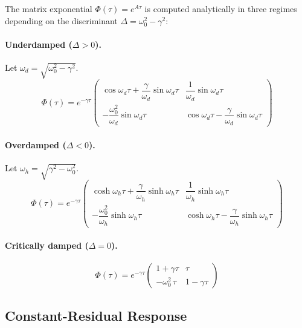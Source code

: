\documentclass[11pt,a4paper]{article}
\begin{document}
The matrix exponential $\Phi(\tau) = e^{A\tau}$ is computed analytically in
three regimes depending on the discriminant
$\Delta = \omega_0^2 - \gamma^2$:

\paragraph{Underdamped ($\Delta > 0$).}
Let $\omega_d = \sqrt{\omega_0^2 - \gamma^2}$.
\begin{equation}\label{eq:phi-under}
  \Phi(\tau) = e^{-\gamma\tau}
  \begin{pmatrix}
    \cos\omega_d\tau + \dfrac{\gamma}{\omega_d}\sin\omega_d\tau &
    \dfrac{1}{\omega_d}\sin\omega_d\tau \\[8pt]
    -\dfrac{\omega_0^2}{\omega_d}\sin\omega_d\tau &
    \cos\omega_d\tau - \dfrac{\gamma}{\omega_d}\sin\omega_d\tau
  \end{pmatrix}
\end{equation}

\paragraph{Overdamped ($\Delta < 0$).}
Let $\omega_h = \sqrt{\gamma^2 - \omega_0^2}$.
\begin{equation}\label{eq:phi-over}
  \Phi(\tau) = e^{-\gamma\tau}
  \begin{pmatrix}
    \cosh\omega_h\tau + \dfrac{\gamma}{\omega_h}\sinh\omega_h\tau &
    \dfrac{1}{\omega_h}\sinh\omega_h\tau \\[8pt]
    -\dfrac{\omega_0^2}{\omega_h}\sinh\omega_h\tau &
    \cosh\omega_h\tau - \dfrac{\gamma}{\omega_h}\sinh\omega_h\tau
  \end{pmatrix}
\end{equation}

\paragraph{Critically damped ($\Delta = 0$).}
\begin{equation}\label{eq:phi-crit}
  \Phi(\tau) = e^{-\gamma\tau}
  \begin{pmatrix}
    1 + \gamma\tau & \tau \\
    -\omega_0^2\,\tau & 1 - \gamma\tau
  \end{pmatrix}
\end{equation}

\subsection{Constant-Residual Response}
\end{document}

